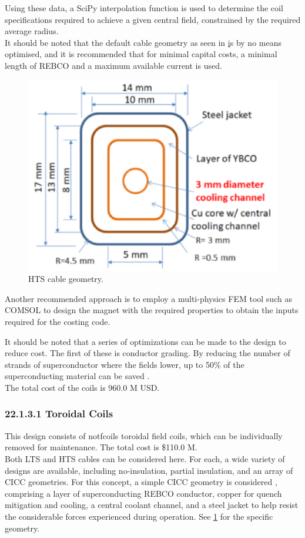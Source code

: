 Using these data, a SciPy interpolation function is used to determine the coil specifications required to achieve a given central field, constrained by the required average radius.\\

It should be noted that the default cable geometry as seen in \href{fig:yuhu_cs} is by no means optimised, and it is recommended that for minimal capital costs, a minimal length of REBCO and a maximum available current is used.


\begin{figure}[h]
    \centering
    \includegraphics[width =0.5\linewidth]{StandardFigures/yuhu_cs.pdf}
    \caption{HTS cable geometry.}
    \label{fig:yuhu_cs}
\end{figure}

Another recommended approach is to employ a multi-physics FEM tool such as COMSOL to design the magnet with the required properties to obtain the inputs required for the costing code.

It should be noted that a series of optimizations can be made to the design to reduce cost. The first of these is conductor grading. By reducing the number of strands of superconductor where the fields lower, up to 50\% of the superconducting material can be saved \cite{uglietti2018progressing}.\\

The total cost of the coils is 960.0 M USD.


\subsubsection*{22.1.3.1 Toroidal Coils}

This design consists of notfcoils toroidal field coils, which can be individually removed for maintenance. The total cost is \$110.0 M.\\

Both LTS and HTS cables can be considered here. For each, a wide variety of designs are available, including no-insulation, partial insulation, and an array of CICC geometries. For this concept, a simple CICC geometry is considered \cite{Menard2016}, comprising a layer of superconducting REBCO conductor, copper for quench mitigation and cooling, a central coolant channel, and a steel jacket to help resist the considerable forces experienced during operation. See \ref{fig:yuhu_cs} for the specific geometry.\\

